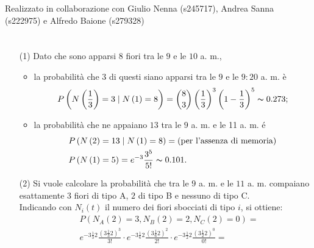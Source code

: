 \documentclass[12pt]{homework}
\begin{document}
\maketitle
\begin{center}
Realizzato in collaborazione con Giulio Nenna (s245717), Andrea Sanna (s222975) e Alfredo Baione (s279328)
\end{center}
\section{}%
  
    
    
  \begin{enumerate}
 
  
    \item[(1)]
    Dato che sono apparsi $8$ fiori tra le $9$ e le $10$ a. m.,
    \begin{itemize}
    \item
    la probabilità che $3$ di questi siano apparsi tra le $9$ e le $9:20$ a. m. è
    \begin{equation*}
    P\left(N\left(\frac{1}{3}\right)=3\mid N\left(1\right)=8\right)=\binom{8}{3}\left(\frac{1}{3}\right)^{3}\left(1-\frac{1}{3}\right)^{5}\thicksim 0.273;
    \end{equation*}
    \item
    la probabilità che ne appaiano $13$ tra le $9$ a. m. e le 11 a. m. é
     \begin{align*}
     &P\left(N\left(2\right)=13\mid N\left(1\right)=8\right)=\text{(per l'assenza di memoria)}\\
     &P\left(N\left(1\right)=5\right)=e^{-3}\frac{3^{5}}{5!}\thicksim 0.101.
     \end{align*}
    \end{itemize} 
    \item[(2)]
    Si vuole calcolare la probabilità che tra le $9$ a. m. e le $11$ a. m. compaiano esattamente $3$ fiori di tipo A, $2$ di tipo B e nessuno di tipo C.\\
    Indicando con $N_{i}\left(t\right)$ il numero dei fiori sbocciati di tipo $i$, si ottiene:
    \begin{align*}
    &P\left(N_{A}\left(2\right)=3, N_{B}\left(2\right)=2,N_{C}\left(2\right)=0\right)=\\
    &e^{-3\frac{1}{3}2}\frac{\left(3\frac{1}{3}2\right)^{3}}{3!}\cdot e^{-3\frac{1}{6}2}\frac{\left(3\frac{1}{6}2\right)^{2}}{2!}\cdot e^{-3\frac{1}{2}2}\frac{\left(3\frac{1}{2}2\right)^{0}}{0!}= \\

\end{align*}
\end{enumerate}
\end{document}
